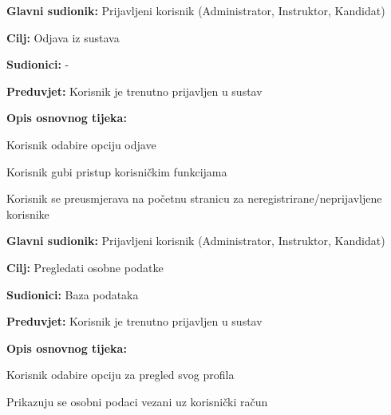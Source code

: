 \noindent {}
\begin{packed_item}
	
	\item \textbf{Glavni sudionik:} Prijavljeni korisnik (Administrator, Instruktor, Kandidat)
	\item  \textbf{Cilj:} Odjava iz sustava 
	\item  \textbf{Sudionici:} -
	\item  \textbf{Preduvjet:} Korisnik je trenutno prijavljen u sustav
	\item  \textbf{Opis osnovnog tijeka:}
	
	\item[] \begin{packed_enum}
		
		\item Korisnik odabire opciju odjave
		\item Korisnik gubi pristup korisničkim funkcijama
		\item Korisnik se preusmjerava na početnu stranicu za neregistrirane/neprijavljene korisnike 
		
	\end{packed_enum}
\end{packed_item}


\noindent {}
\begin{packed_item}
	
	\item \textbf{Glavni sudionik:} Prijavljeni korisnik (Administrator, Instruktor, Kandidat)
	\item  \textbf{Cilj:} Pregledati osobne podatke
	\item  \textbf{Sudionici:} Baza podataka
	\item  \textbf{Preduvjet:} Korisnik je trenutno prijavljen u sustav
	\item  \textbf{Opis osnovnog tijeka:}
	
	\item[] \begin{packed_enum}
		
		\item Korisnik odabire opciju za pregled svog profila
		\item Prikazuju se osobni podaci vezani uz korisnički račun
		
	\end{packed_enum}
\end{packed_item}


